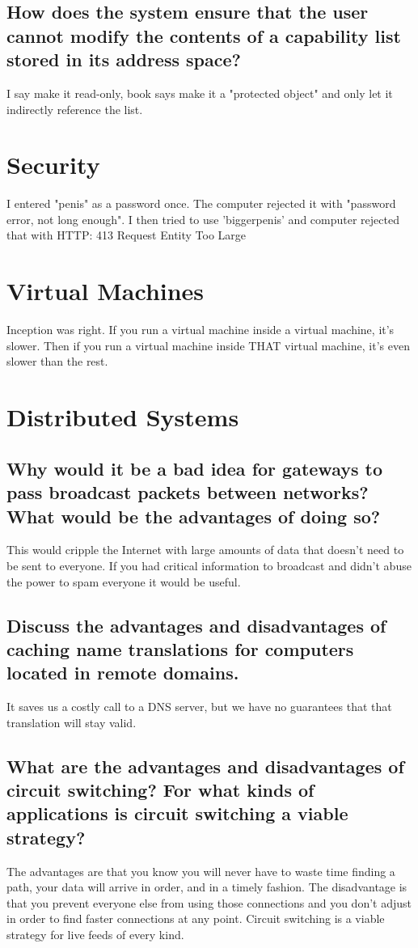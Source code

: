 \documentclass{book}%
\begin{document}
\section{How does the system ensure that the user cannot modify the contents of a capability list stored in its address space?}
I say make it read-only, book says make it a "protected object" and only let it indirectly reference the list.
\chapter{Security}
I entered "penis" as a password once. The computer rejected it with "password error, not long enough". I then tried to use 'biggerpenis' and computer rejected that with HTTP: 413 Request Entity Too Large
\chapter{Virtual Machines}
Inception was right. If you run a virtual machine inside a virtual machine, it's slower. Then if you run a virtual machine inside THAT virtual machine, it's even slower than the rest.
\chapter{Distributed Systems}
\section{Why would it be a bad idea for gateways to pass broadcast packets between networks? What would be the advantages of doing so?}
This would cripple the Internet with large amounts of data that doesn't need to be sent to everyone. If you had critical information to broadcast and didn't abuse the power to spam everyone it would be useful.
\section{Discuss the advantages and disadvantages of caching name translations for computers located in remote domains.}
It saves us a costly call to a DNS server, but we have no guarantees that that translation will stay valid.
\section{What are the advantages and disadvantages of circuit switching? For what kinds of applications is circuit switching a viable strategy?}
The advantages are that you know you will never have to waste time finding a path, your data will arrive in order, and in a timely fashion. The disadvantage is that you prevent everyone else from using those connections and you don't adjust in order to find faster connections at any point.  Circuit switching is a viable strategy for live feeds of every kind.
\end{document}

